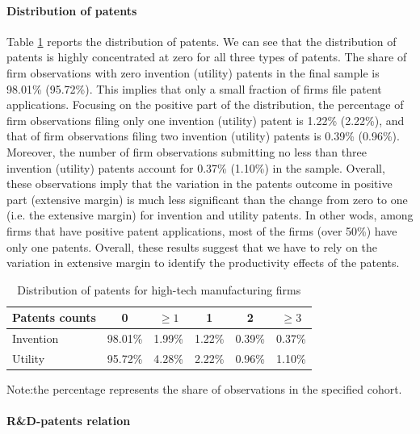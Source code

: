 \documentclass[English]{article}
\begin{document}
\paragraph{Distribution of patents}

Table \ref{T3} reports the distribution of patents. We can see that
the distribution of patents is highly concentrated at zero for all
three types of patents. The share of firm observations
with zero invention (utility) patents in the final sample is 98.01\%
(95.72\%). This implies that only a small fraction of firms file
patent applications. Focusing on the positive part of the distribution,
the percentage of firm observations filing only one invention (utility)
patent is 1.22\% (2.22\%), and that of firm observations filing two
invention (utility) patents is 0.39\% (0.96\%). Moreover, the number
of firm observations submitting no less than three invention (utility)
patents account for 0.37\% (1.10\%) in the sample. Overall,
these observations imply that the variation in the patents outcome
in positive part (extensive margin) is much less significant than
the change from zero to one (i.e. the extensive margin) for invention
and utility patents. In other wods, among firms that have positive
patent applications, most of the firms (over 50\%) have only one patents. Overall, these results suggest that we have to rely on the variation in extensive margin to identify the productivity effects of the patents.

\begin{table}[H]
\centering
\caption{Distribution of patents for high-tech manufacturing firms}
\label{T3}
\begin{tabular}{lccccc}
\hline\hline
Patents counts & 0       & $\geq 1$ & 1      & 2      & $\geq 3$ \\
\hline
Invention&98.01\% & 1.99\% & 1.22\% & 0.39\% & 0.37\% \\
Utility&95.72\% & 4.28\% & 2.22\% & 0.96\% & 1.10\% \\
\hline\hline
\end{tabular}

{\small{}Note:the percentage represents the share of observations in the specified cohort.}{\small \par}
\end{table}

\paragraph{R\&D-patents relation}
\end{document}
